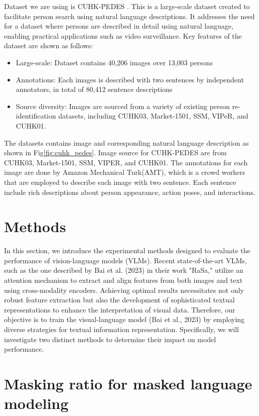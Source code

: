 Dataset we are using is CUHK-PEDES \cite{li2017personsearchnaturallanguage}. This is a large-scale dataset created to facilitate person search using natural language descriptions. It addresses the need for a dataset where persons are described in detail using natural language, enabling practical applications such as video surveillance. Key features of the dataset are shown as follows:
\begin{itemize}
  \item Large-scale: Dataset contains 40,206 images over 13,003 persons 
  \item Annotations: Each images is described with two sentences by independent annotators, in total of 80,412 sentence descriptions
  \item Source diversity: Images are sourced from a variety of existing person re-identification datasets, including CUHK03\cite{li2014deepreid}, Market-1501\cite{7410490}, SSM\cite{ssm}, VIPeR\cite{viper}, and CUHK01\cite{li2012human}.
\end{itemize}

The datasets contains image and corresponding natural language description as shown in Fig\ref{fig:cuhk_pedes}. Image source for CUHK-PEDES are from CUHK03, Market-1501, SSM, VIPER, and CUHK01. The annotations for each image are done by Amazon Mechanical Turk(AMT), which is a crowd workers that are employed to describe each image with two sentence. Each sentence include rich descriptions about person appearance, action poses, and interactions.


\section{Methods}
In this section, we introduce the experimental methods designed to evaluate the performance of vision-language models (VLMs). Recent state-of-the-art VLMs, such as the one described by Bai et al. (2023) in their work "RaSa," utilize an attention mechanism to extract and align features from both images and text using cross-modality encoders. Achieving optimal results necessitates not only robust feature extraction but also the development of sophisticated textual representations to enhance the interpretation of visual data. Therefore, our objective is to train the visual-language model (Bai et al., 2023) by employing diverse strategies for textual information representation. Specifically, we will investigate two distinct methods to determine their impact on model performance.


\section{Masking ratio for masked language modeling} 

